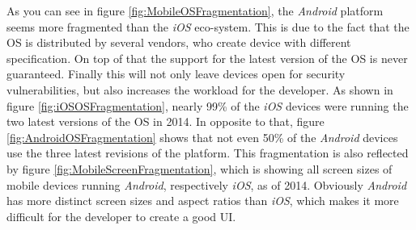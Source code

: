As you can see in figure \vref{fig:MobileOSFragmentation}, the \emph{Android} platform seems more fragmented than the \emph{iOS} eco-system. This is due to the fact that the \gls{OS} is distributed by several vendors, who create device with different specification. On top of that the support for the latest version of the \gls{OS} is never guaranteed. Finally this will not only leave devices open for security vulnerabilities, but also increases the workload for the developer. As shown in figure \vref{fig:iOSOSFragmentation}, nearly 99\% of the \emph{iOS} devices were running the two latest versions of the \gls{OS} in 2014. In opposite to that, figure \ref{fig:AndroidOSFragmentation} shows that not even 50\% of the \emph{Android} devices use the three latest revisions of the platform. This fragmentation is also reflected by figure \vref{fig:MobileScreenFragmentation}, which is showing all screen sizes of mobile devices running \emph{Android}, respectively \emph{iOS}, as of 2014. Obviously \emph{Android} has more distinct screen sizes and aspect ratios than \emph{iOS}, which makes it more difficult for the developer to create a good \gls{UI}.

